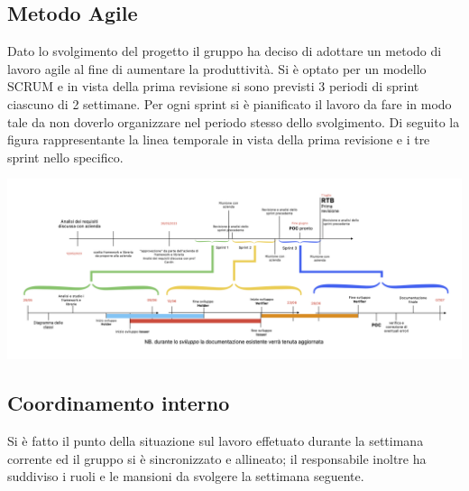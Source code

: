 \subsection{Metodo Agile}
Dato lo svolgimento del progetto il gruppo ha deciso di adottare un metodo di lavoro agile al fine di aumentare la produttività.
Si è optato per un modello SCRUM e in vista della prima revisione si sono previsti 3 periodi di sprint ciascuno di 2 settimane. 
Per ogni sprint si è pianificato il lavoro da fare in modo tale da non doverlo organizzare nel periodo stesso dello svolgimento.
Di seguito la figura rappresentante la linea temporale in vista della prima revisione e i tre sprint nello specifico. 
\begin{center}
	\includegraphics[scale = 0.35]{./res/images/RTB-1a-revisione.png}
\end{center}

\subsection{Coordinamento interno}
Si è fatto il punto della situazione sul lavoro effetuato durante la settimana corrente ed il gruppo si è sincronizzato e allineato; il responsabile inoltre ha suddiviso i ruoli e le mansioni da svolgere la settimana seguente. 
